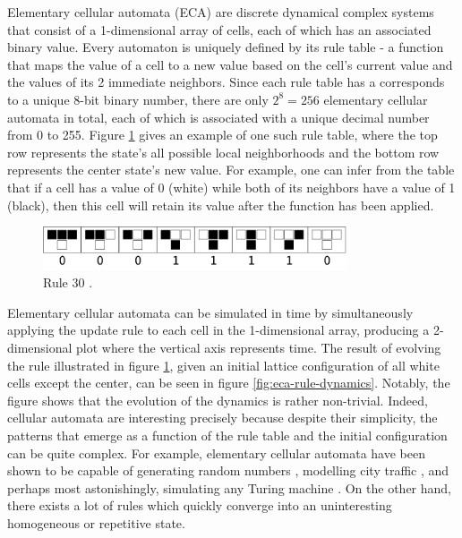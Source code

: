 \documentclass[12pt]{article}
\begin{document}
Elementary cellular automata (ECA) are discrete dynamical complex systems that consist of a 1-dimensional array of cells, each of which has an associated binary value. Every automaton is uniquely defined by its rule table - a function that maps the value of a cell to a new value based on the cell's current value and the values of its 2 immediate neighbors. Since each rule table has a corresponds to a unique 8-bit binary number, there are only $2^8 = 256$ elementary cellular automata in total, each of which is associated with a unique decimal number from 0 to 255. Figure \ref{fig:eca-rule-table} gives an example of one such rule table, where the top row represents the state's all possible local neighborhoods and the bottom row represents the center state's new value. For example, one can infer from the table that if a cell has a value of 0 (white) while both of its neighbors have a value of 1 (black), then this cell will retain its value after the function has been applied. 

\begin{figure} [!h]
\begin{center}
\includegraphics[width=0.8\textwidth]{eca-rule-example}
\caption{Rule 30 \cite{weisstein-eca}.}
\label{fig:eca-rule-table}
\end{center}
\end{figure}

Elementary cellular automata can be simulated in time by simultaneously applying the update rule to each cell in the 1-dimensional array, producing a 2-dimensional plot where the vertical axis represents time. The result of evolving the rule illustrated in figure \ref{fig:eca-rule-table}, given an initial lattice configuration of all white cells except the center, can be seen in figure \ref{fig:eca-rule-dynamics}. Notably, the figure shows that the evolution of the dynamics is rather non-trivial. Indeed, cellular automata are interesting precisely because despite their simplicity, the patterns that emerge as a function of the rule table and the initial configuration can be quite complex. For example, elementary cellular automata have been shown to be capable of generating random numbers \cite{eca-random-gen}, modelling city traffic \cite{eca-city-traffic}, and perhaps most astonishingly, simulating any Turing machine \cite{eca-universal}. On the other hand, there exists a lot of rules which quickly converge into an uninteresting homogeneous or repetitive state. 
\end{document}

